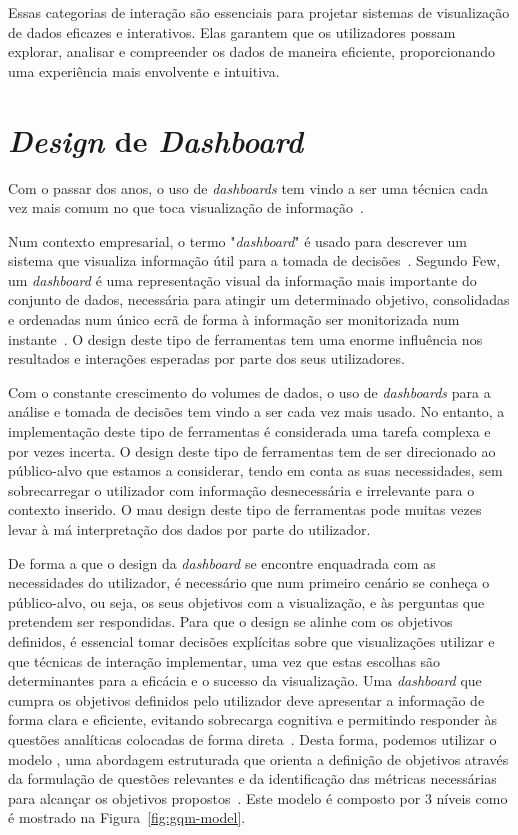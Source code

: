 Essas categorias de interação são essenciais para projetar sistemas de visualização de dados eficazes e interativos. Elas garantem que os utilizadores possam explorar, analisar e compreender os dados de maneira eficiente, proporcionando uma experiência mais envolvente e intuitiva. 

\section{\textit{Design} de \textit{Dashboard}}
\label{sec:design_dashboard}

Com o passar dos anos, o uso de \textit{dashboards} tem vindo a ser uma técnica cada vez mais comum no que toca visualização de informação~\cite{sarikaya2018we}. 

Num contexto empresarial, o termo "\textit{dashboard}" é usado para descrever um sistema que visualiza informação útil para a tomada de decisões~\cite{janes2013effective}. Segundo Few, um \textit{dashboard} é uma representação visual da informação mais importante do conjunto de dados, necessária para atingir um determinado objetivo, consolidadas e ordenadas num único ecrã de forma à informação ser monitorizada num instante~\cite{few2005common}. O design deste tipo de ferramentas tem uma enorme influência nos resultados e interações esperadas por parte dos seus utilizadores. 

Com o constante crescimento do volumes de dados, o uso de \textit{dashboards} para a análise e tomada de decisões tem vindo a ser cada vez mais usado. No entanto, a implementação deste tipo de ferramentas é considerada uma tarefa complexa e por vezes incerta. O design deste tipo de ferramentas tem de ser direcionado ao público-alvo que estamos a considerar, tendo em conta as suas necessidades, sem sobrecarregar o utilizador com informação desnecessária e irrelevante para o contexto inserido. O mau design deste tipo de ferramentas pode muitas vezes levar à má interpretação dos dados por parte do utilizador.

De forma a que o design da \textit{dashboard} se encontre enquadrada com as necessidades do utilizador, é necessário que num primeiro cenário se conheça o público-alvo, ou seja, os seus objetivos com a visualização, e às perguntas que pretendem ser respondidas. Para que o design se alinhe com os objetivos definidos, é essencial tomar decisões explícitas sobre que visualizações utilizar e que técnicas de interação implementar, uma vez que estas escolhas são determinantes para a eficácia e o sucesso da visualização. Uma \textit{dashboard} que cumpra os objetivos definidos pelo utilizador deve apresentar a informação de forma clara e eficiente, evitando sobrecarga cognitiva e permitindo responder às questões analíticas colocadas de forma direta~\cite{pappas2011riding}. Desta forma, podemos utilizar o modelo , uma abordagem estruturada que orienta a definição de objetivos através da formulação de questões relevantes e da identificação das métricas necessárias para alcançar os objetivos propostos~\cite{janes2013effective}. Este modelo é composto por 3 níveis como é mostrado na Figura~\ref{fig:gqm-model}.

